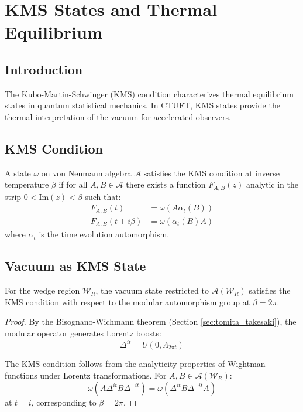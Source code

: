 \section{KMS States and Thermal Equilibrium}
\label{sec:kms}

\subsection{Introduction}

The Kubo-Martin-Schwinger (KMS) condition characterizes thermal equilibrium states in quantum statistical mechanics. In CTUFT, KMS states provide the thermal interpretation of the vacuum for accelerated observers.

\subsection{KMS Condition}

\begin{definition}
A state $\omega$ on von Neumann algebra $\mathcal{A}$ satisfies the KMS condition at inverse temperature $\beta$ if for all $A, B \in \mathcal{A}$ there exists a function $F_{A,B}(z)$ analytic in the strip $0 < \text{Im}(z) < \beta$ such that:
\begin{align}
    F_{A,B}(t) &= \omega(A \alpha_t(B)) \\
    F_{A,B}(t + i\beta) &= \omega(\alpha_t(B) A)
\end{align}
where $\alpha_t$ is the time evolution automorphism.
\end{definition}

\subsection{Vacuum as KMS State}

\begin{theorem}
For the wedge region $\mathcal{W}_R$, the vacuum state restricted to $\mathcal{A}(\mathcal{W}_R)$ satisfies the KMS condition with respect to the modular automorphism group at $\beta = 2\pi$.
\end{theorem}

\begin{proof}
By the Bisognano-Wichmann theorem (Section \ref{sec:tomita_takesaki}), the modular operator generates Lorentz boosts:
\begin{equation}
    \Delta^{it} = U(0, \Lambda_{2\pi t})
\end{equation}

The KMS condition follows from the analyticity properties of Wightman functions under Lorentz transformations. For $A, B \in \mathcal{A}(\mathcal{W}_R)$:
\begin{equation}
    \omega(A \Delta^{it} B \Delta^{-it}) = \omega(\Delta^{it} B \Delta^{-it} A)
\end{equation}
at $t = i$, corresponding to $\beta = 2\pi$.
\end{proof}

